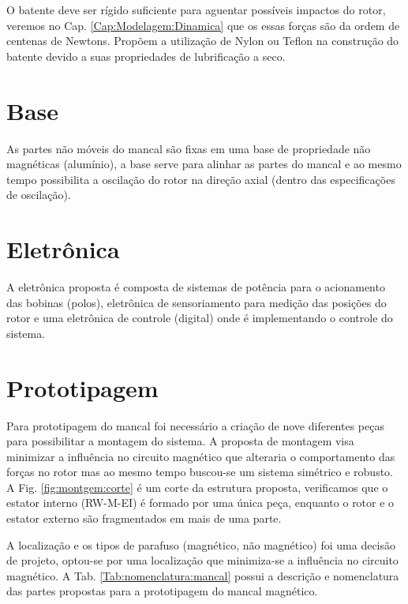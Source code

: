 O batente deve ser rígido suficiente para aguentar possíveis impactos do rotor, veremos no Cap. \ref{Cap:Modelagem:Dinamica} que os essas forças são da ordem de centenas de Newtons. Propõem a utilização de Nylon ou Teflon na construção do batente devido a suas propriedades de lubrificação a seco. 

\section{Base}

As partes não móveis do mancal são fixas em uma base de propriedade não magnéticas (alumínio), a base serve para alinhar as partes do mancal e ao mesmo tempo possibilita a oscilação do rotor na direção axial (dentro das especificações de oscilação). 

\section{Eletrônica}

A eletrônica proposta é composta de sistemas de potência para o acionamento das bobinas (polos), eletrônica de sensoriamento para medição das posições do rotor e uma eletrônica de controle (digital) onde é implementando o controle do sistema. 


\section{Prototipagem}

Para prototipagem do mancal foi necessário a criação de nove diferentes peças para possibilitar a montagem do sistema. A proposta de montagem visa minimizar a influência no circuito magnético que alteraria o comportamento das forças no rotor mas ao mesmo tempo buscou-se um sistema simétrico e robusto.  A Fig. \ref{fig:montgem:corte} é um corte da estrutura proposta, verificamos que o estator interno (RW-M-EI) é formado por uma única peça, enquanto o rotor e o estator externo são fragmentados em mais de uma parte.

 A localização e os tipos de parafuso (magnético, não magnético) foi uma decisão de projeto, optou-se por uma localização que minimiza-se a influência no circuito magnético. A Tab. \ref{Tab:nomenclatura:mancal} possui a descrição e nomenclatura das partes propostas para a prototipagem do mancal magnético.
 
